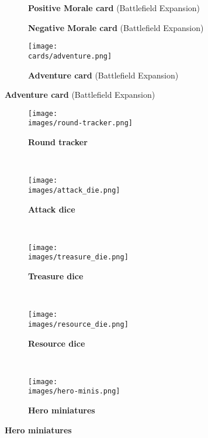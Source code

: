 \begin{figure}[H]
  \centering
  \begin{subfigure}[b]{0.25\linewidth}
    \caption{\textbf{Positive Morale card} (Battlefield Expansion)}
  \end{subfigure}
  \begin{subfigure}[b]{0.25\linewidth}
    \caption{\textbf{Negative Morale card} (Battlefield Expansion)}
  \end{subfigure}
  \begin{subfigure}[b]{0.25\linewidth}
    \centering
    \texttt{[image: \\cards/adventure.png]}
    \caption{\textbf{Adventure card} (Battlefield Expansion)}
  \end{subfigure}
\end{figure}
\vspace*{-2em}\begin{figure}[H]
  \centering
  \begin{subfigure}[b]{0.3\linewidth}
    \centering
    \texttt{[image: \\images/round-tracker.png]}
    \caption{\textbf{Round tracker}}
  \end{subfigure}
  ~
  \begin{subfigure}[b]{0.1\linewidth}
    \centering
    \texttt{[image: \\images/attack\_die.png]}
    \caption{\textbf{Attack dice}}
  \end{subfigure}
  ~
  \begin{subfigure}[b]{0.1\linewidth}
    \centering
    \texttt{[image: \\images/treasure\_die.png]}
    \caption{\textbf{Treasure dice}}
  \end{subfigure}
  ~
  \begin{subfigure}[b]{0.12\linewidth}
    \centering
    \texttt{[image: \\images/resource\_die.png]}
    \caption{\textbf{Resource dice}}
  \end{subfigure}
  ~
  \begin{subfigure}[b]{0.3\linewidth}
    \centering
    \texttt{[image: \\images/hero-minis.png]}
    \vspace*{-2em}
    \caption{\textbf{Hero miniatures}}
  \end{subfigure}
\end{figure}
